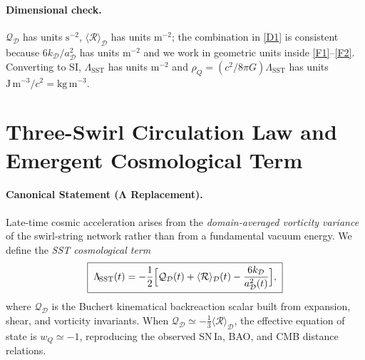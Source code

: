 \documentclass[reprint,aps,onecolumn,nofootinbib]{revtex4-2}
\begin{document}
    \paragraph{Dimensional check.}
        $\mathcal{Q}_\mathcal{D}$ has units $\mathrm{s^{-2}}$, $\langle \mathcal{R}\rangle_\mathcal{D}$ has units $\mathrm{m^{-2}}$; the combination in \eqref{D1} is consistent because $6k_\mathcal{D}/a_\mathcal{D}^2$ has units $\mathrm{m^{-2}}$ and we work in geometric units inside \eqref{F1}–\eqref{F2}. Converting to SI, $\Lambda_{\!\mathrm{SST}}$ has units $\mathrm{m^{-2}}$ and $\rho_Q=(c^{2}/8\pi G)\Lambda_{\!\mathrm{SST}}$ has units $\mathrm{J\,m^{-3}}/c^{2}=\mathrm{kg\,m^{-3}}$.


    \section{Three-Swirl Circulation Law and Emergent Cosmological Term}
    \label{sec:SST-three-swirl-Lambda}

    \paragraph{Canonical Statement (Λ Replacement).}
        Late-time cosmic acceleration arises from the \emph{domain-averaged vorticity variance}
        of the swirl-string network rather than from a fundamental vacuum energy. We define
        the \emph{SST cosmological term}
        \begin{equation}
        \boxed{\;
        \Lambda_{\!\mathrm{SST}}(t)=
            -\frac{1}{2}\Bigl[\mathcal{Q}_\mathcal{D}(t)+\langle\mathcal{R}\rangle_\mathcal{D}(t)
            -\frac{6k_\mathcal{D}}{a_\mathcal{D}^{2}(t)}\Bigr],
            \;}
        \label{eq:SST-Lambda}
        \end{equation}
        where $\mathcal{Q}_\mathcal{D}$ is the Buchert kinematical backreaction scalar
        \cite{Buchert2000,Buchert2001} built from expansion, shear, and vorticity invariants.
        When $\mathcal{Q}_\mathcal{D}\simeq -\tfrac13\langle\mathcal{R}\rangle_\mathcal{D}$,
        the effective equation of state is $w_Q\simeq-1$, reproducing the observed SN\,Ia,
        BAO, and CMB distance relations.
\end{document}
